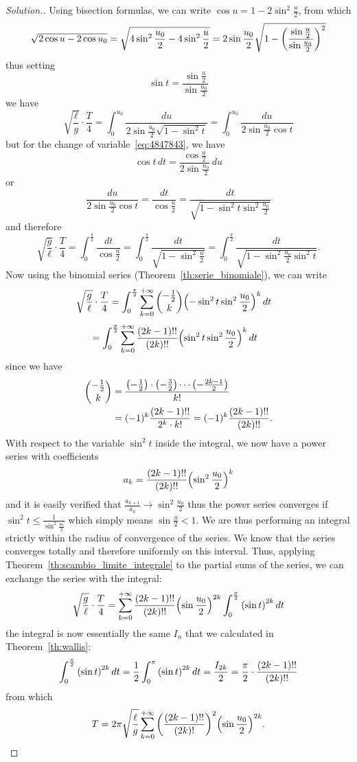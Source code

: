 \begin{proof}[Solution.]
Using bisection formulas, we can write $\cos u = 1 - 2 \sin^2\frac u 2$, from
which
\[
 \sqrt{2\cos u - 2\cos u_0}
 = \sqrt{4\sin^2 \frac {u_0} 2 - 4 \sin^2 \frac{u}{2}}
  = 2\sin \frac{u_0}2 \sqrt{1-{\left( \frac{\sin \frac u 2}{\sin \frac
 {u_0}2} \right)}^2}
\]
thus setting
\begin{equation}\label{eq:4847843}
 \sin t = \frac{\sin \frac u 2}{\sin \frac{u_0} 2}
\end{equation}
we have
\[
  \sqrt{\frac \ell g} \cdot \frac T 4
  =  \int_0^{u_0} \frac{du}{2\sin \frac {u_0}2 \sqrt{1-\sin^2 t}}
  = \int_0^{u_0} \frac{du}{2\sin \frac{u_0}2 \cos t}
\]
but for the change of variable~\eqref{eq:4847843}, we have
\[
  \cos t \, dt = \frac{\cos \frac u 2 }{2 \sin \frac{u_0} 2}\, du
\]
or
\[
 \frac{du}{2\sin \frac {u_0} 2 \cos t} = \frac{dt}{\cos \frac u 2}
 = \frac{dt}{\sqrt{1-\sin^2 t \sin^2\frac{u_0}{2}}}
\]
and therefore
\[
\sqrt{\frac g \ell} \cdot \frac{T}{4}
= \int_0^{\frac \pi 2} \frac{dt}{\cos \frac u 2}
= \int_0^{\frac \pi 2} \frac{dt}{\sqrt{1-\sin^2 \frac u 2}}
= \int_0^{\frac \pi 2} \frac{dt}{\sqrt{1-\sin^2 \frac{u_0}{2} \sin^2 t}}.
\]
Now using the binomial series (Theorem~\ref{th:serie_binomiale}), we can write
\begin{align*}
\sqrt{\frac g \ell} \cdot\frac{T}{4}
&= \int_0^{\frac \pi 2} \sum_{k=0}^{+\infty}{-\frac 1 2 \choose k}
{\left( -\sin^2 t\sin^2 \frac{u_0}2 \right)}^{k}\, dt
\end{align*}
\begin{align*}
&= \int_0^{\frac \pi 2} \sum_{k=0}^{+\infty}\frac{(2k-1)!!}{(2k)!!}
{\left( \sin^2 t\sin^2 \frac{u_0}2 \right)}^{k}\, dt
\end{align*}
since we have
\begin{align*}
  {-\frac 1 2 \choose k}
    &= \frac{{\left( -\frac 1 2 \right)}\cdot {\left( -\frac 3 2 \right)} \cdots
  {\left( -\frac{2k-1} 2 \right)}}{k!}\\
  &= (-1)^k\frac{(2k-1)!!}{2^k \cdot k!} = (-1)^k \frac{(2k-1)!!}{(2k)!!}.
\end{align*}
With respect to the variable $\sin^2 t$ inside the integral, we now have a power
series with coefficients
\[
 a_k = \frac{(2k-1)!!}{(2k)!!} {\left( \sin^2\frac{u_0} 2 \right)}^{k}
\]
and it is easily verified that
$  \frac{a_{k+1}}{a_k} \to \sin^2 \frac{u_0}{2}$
thus the power series converges if
$ \sin^2 t \le \frac{1}{\sin^2 \frac{u_0}{2}}$
which simply means
$ \sin \frac u 2 < 1$.
We are thus performing an integral strictly within the radius of convergence of
the series.
We know that the series converges totally and therefore uniformly on this
interval.
Thus, applying Theorem~\ref{th:scambio_limite_integrale} to the partial sums of
the series, we can exchange the series with the integral:
\[
\sqrt{\frac g \ell} \cdot\frac{T}{4}
= \sum_{k=0}^{+\infty}\frac{(2k-1)!!}{(2k)!!} {\left( \sin \frac{u_0}2 \right)}^{2k}
\int_0^{\frac \pi 2}  {\left( \sin t \right)}^{2k}\, dt
\]
the integral is now essentially the same $I_n$ that we calculated in
Theorem~\ref{th:wallis}:
\[
  \int_0^{\frac \pi 2} {\left( \sin t \right)}^{2k}\, dt
  = \frac 1 2 \int_0^{\pi} {\left( \sin t \right)}^{2k}\, dt
  = \frac{I_{2k}}{2}
  = \frac \pi 2 \cdot\frac{(2k-1)!!}{(2k)!!}
\]
from which
\[
T
= 2\pi\sqrt{\frac \ell g}\sum_{k=0}^{+\infty} {\left( \frac{(2k-1)!!}{(2k)!} \right)}^2
{\left( \sin \frac{u_0} 2 \right)}^{2k}.
\]


\end{proof}
